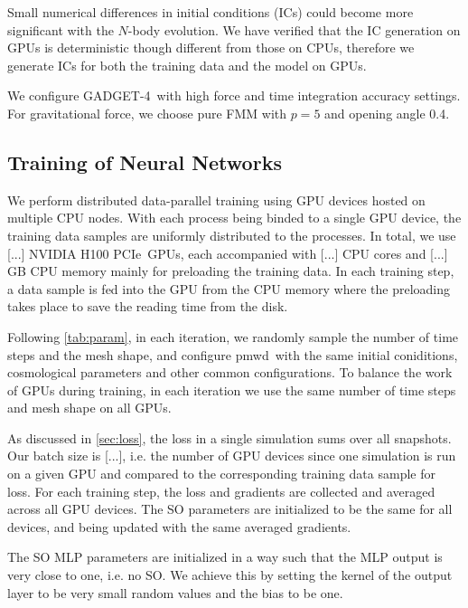 \documentclass[modern, trackchanges, dvipsnames]{aastex631}
\newcommand{\pmwd}{{\usefont{T1}{nova}{m}{sl}pmwd}}
\newcommand{\GADGET}{{{\fontsize{10pt}{12pt}\selectfont GADGET}-4}}
\newcommand{\GPU}{NVIDIA H100 PCIe}  %
\begin{document}
Small numerical differences in initial conditions (ICs) could become
more significant with the $N$-body evolution.
We have verified that the IC generation on GPUs is deterministic though
different from those on CPUs, therefore we generate ICs for both the
training data and the model on GPUs.

We configure \GADGET\ with high force and time integration accuracy
settings.
For gravitational force, we choose pure FMM with $p=5$ and opening angle
0.4.


\vspace{1em}
\subsection{Training of Neural Networks}


We perform distributed data-parallel training using GPU devices hosted on
multiple CPU nodes.
With each process being binded to a single GPU device, the training data samples
are uniformly distributed to the processes.
In total, we use [...] \GPU\ GPUs, each accompanied with [...] CPU cores and
[...] GB CPU memory mainly for preloading the training data.
In each training step, a data sample is fed into the GPU from the CPU memory
where the preloading takes place to save the reading time from the disk.

Following \autoref{tab:param}, in each iteration, we randomly sample the number
of time steps and the mesh shape, and configure \pmwd\ with the same initial
coniditions, cosmological parameters and other common configurations.
To balance the work of GPUs during training, in each iteration we use
the same number of time steps and mesh shape on all GPUs.

As discussed in \autoref{sec:loss}, the loss in a single simulation sums over
all snapshots.
Our batch size is [...], i.e. the number of GPU devices since one simulation is
run on a given GPU and compared to the corresponding training data sample for
loss.
For each training step, the loss and gradients are collected and averaged across
all GPU devices.
The SO parameters are initialized to be the same for all devices, and being
updated with the same averaged gradients.


The SO MLP parameters are initialized in a way such that the MLP output is very
close to one, i.e. no SO.
We achieve this by setting the kernel of the output layer to be very small
random values and the bias to be one.
\end{document}
